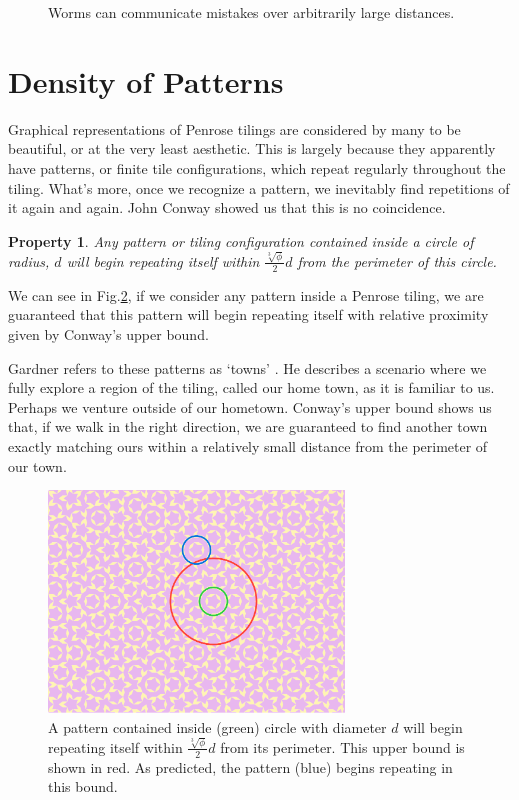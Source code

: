 \documentclass[
  oneside,
  11pt, a4paper,
  footinclude=true,
  headinclude=true,
  cleardoublepage=empty
]{scrbook}
\newtheorem{myprop}{Property}
\begin{document}
\begin{figure}[h]
\caption{Worms can communicate mistakes over arbitrarily large distances.}
\label{fig:wormmistakes}
\end{figure}

\section{Density of Patterns}
Graphical representations of Penrose tilings are considered by many to be beautiful, or at the very least aesthetic. This is largely because they apparently have patterns, or finite tile configurations, which repeat regularly throughout the tiling. What's more, once we recognize a pattern, we inevitably find repetitions of it again and again. John Conway showed us that this is no coincidence.

\begin{myprop}
Any pattern or tiling configuration contained inside a circle of radius, $d$ will begin repeating itself within $\frac{\sqrt[3]{\phi}}{2}d$ from the perimeter of this circle. \cite{Gardner1997}
\end{myprop}

We can see in Fig.\ref{fig:patternfind}, if we consider any pattern inside a Penrose tiling, we are guaranteed that this pattern will begin repeating itself with relative proximity given by Conway's upper bound. 

Gardner refers to these patterns as `towns' \cite{Gardner1997}. He describes a scenario where we fully explore a region of the tiling, called our home town, as it is familiar to us. Perhaps we venture outside of our hometown. Conway's upper bound shows us that, if we walk in the right direction, we are guaranteed to find another town exactly matching ours within a relatively small distance from the perimeter of our town.

\begin{figure}
\centering
\includegraphics[width=0.7\textwidth]{PatternFind3}
\caption{A pattern contained inside (green) circle with diameter $d$ will begin repeating itself within $\frac{\sqrt[3]{\phi}}{2}d$ from its perimeter. This upper bound is shown in red. As predicted, the pattern (blue) begins repeating in this bound.}
\label{fig:patternfind}
\end{figure}
\end{document}
